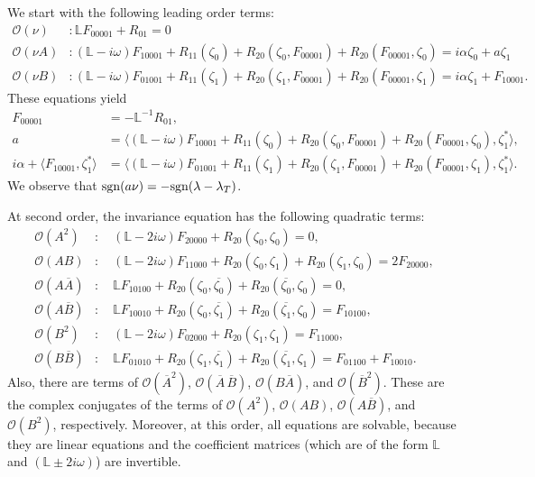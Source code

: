 \documentclass[11pt]{article}
\numberwithin{equation}{section}
\begin{document}
We start with the following leading order terms:
\begin{equation}
\begin{split}
\mathcal{O}(\nu) &: \mathbb{L} F_{00001} + R _{01} = 0 \\
\mathcal{O}(\nu A ) &: (\mathbb{L} - i \omega) F_{10001} + R_{11}(\zeta_0) + R_{20}( \zeta_0,F_{00001}) + R_{20}(F_{00001},\zeta_0) = i \alpha \zeta_0 + a \zeta_1 \\
\mathcal{O}(\nu B) &: (\mathbb{L} - i \omega) F_{01001} + R_{11}(\zeta_1) + R_{20}( \zeta_1,F_{00001}) + R_{20}(F_{00001},\zeta_1) = i \alpha \zeta_1 + F_{10001}.
\end{split}
\end{equation}
These equations yield
\begin{equation}
\begin{split}
F_{00001} &= - \mathbb{L}^{-1} R_{01}, \\
a &= \langle (\mathbb{L} -i \omega) F_{10001} +R_{11} (\zeta_0) +R_{20}(\zeta_0,F_{00001}) + R_{20}(F_{00001},\zeta_0), \zeta_1^* \rangle,\\
i \alpha +\langle F_{10001}, \zeta_1^*\rangle &= \langle (\mathbb{L} -i \omega) F_{01001} +R_{11} (\zeta_1) + R_{20}(\zeta_1,F_{00001}) + R_{20}(F_{00001},\zeta_1),\zeta_1^* \rangle.
\end{split}
\end{equation}
%
We observe that ${\rm sgn}(a \nu) = - {\rm sgn} (\lambda-\lambda_T)$.

At second order, the invariance equation has the following quadratic terms: 
\begin{equation}
\begin{split}
\mathcal{O}(A^2) &: \quad 
   (\mathbb{L} - 2i \omega) F_{20000} + R_{20}(\zeta_0,\zeta_0) = 0, \\
\mathcal{O}(AB) &: \quad 
   (\mathbb{L} - 2i \omega) F_{11000} + R_{20}(\zeta_0,\zeta_1) + R_{20}(\zeta_1,\zeta_0) = 2 F_{20000}, \\
\mathcal{O}(A \overline{A}) &: \quad 
   \mathbb{L} F_{10100} + R_{20}(\zeta_0,\overline{\zeta_0}) + R_{20}(\overline{\zeta_0},\zeta_0) = 0, \\
\mathcal{O}(A \overline{B}) &: \quad 
   \mathbb{L}F_{10010} + R_{20} (\zeta_0,\overline{\zeta_1}) +R_{20}(\overline{\zeta_1},\zeta_0)= F_{10100},\\
\mathcal{O}(B^2) &: \quad 
   (\mathbb{L}-2i\omega) F_{02000} + R_{20}(\zeta_1,\zeta_1) = F_{11000}, \\
\mathcal{O}(B\overline{B}) &: \quad
   \mathbb{L} F_{01010} + R_{20}(\zeta_1,\overline{\zeta_1}) + R_{20} (\overline{\zeta_1},\zeta_1) = F_{01100} + F_{10010}.
\end{split}
\end{equation}
Also, there are terms of 
$\mathcal{O}(\overline{A}^2)$,
$\mathcal{O}(\overline{A}\, \overline{B})$, 
$\mathcal{O}(B \overline{A})$, and
$\mathcal{O}(\overline{B}^2)$.
These are the complex conjugates of the terms of
$\mathcal{O}(A^2)$,
$\mathcal{O}(AB)$, 
$\mathcal{O}(A \overline{B})$, and
$\mathcal{O}(B^2)$, respectively.
Moreover, at this order, all equations are solvable, because they are linear equations and the coefficient matrices (which are of the form $\mathbb{L}$ and $(\mathbb{L} \pm 2 i \omega)$) are invertible.
\end{document}
